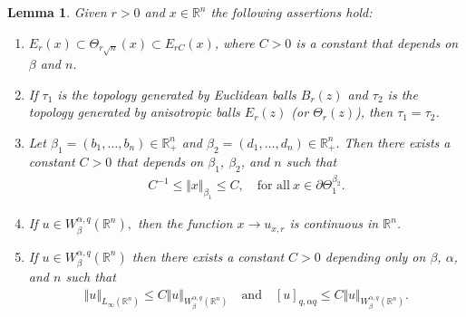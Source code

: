 \documentclass[10pt, leqno]{article}
\newtheorem{lemma}[theorem]{Lemma}
\theoremstyle{definition}
\theoremstyle{remark}
\numberwithin{equation}{section}
\begin{document}
\begin{lemma}
\label{elemntary results}
Given $r > 0$ and $x \in \mathbb{R}^{n}$ the following assertions hold:
\begin{enumerate}
\item $E^{}_{r}(x) \subset \Theta_{r\sqrt{n}}(x) \subset E_{rC}(x)$, where $C>0$ is a constant that depends on $\beta$ and $n$.
\item If $\tau_{1}$ is the topology generated by Euclidean balls $B_{r}(z)$ and $\tau_{2}$ is the topology generated by anisotropic balls $E_{r}(z)$ (or $\Theta_{r}(z)$), then $\tau_{1} = \tau_{2}$.
\item Let $\beta_{1} = (b_{1}, \dots, b_{n})\in \mathbb{R}_{+}^{n}$ and $\beta_{2} = (d_{1}, \dots, d_{n}) \in \mathbb{R}_{+}^{n}$. Then there exists a constant $C>0$ that depends on $\beta_{1}$, $\beta_{2}$, and $n$ such that
\begin{eqnarray}
\label{equivalence between norms on anisotropic sphere 1}
C^{-1} \leq \Vert x \Vert^{}_{\beta_{1}} \leq C, \quad \text{for all} \ x \in \partial \Theta^{\beta_{2}}_{1}.
\end{eqnarray}
\item If $u \in W_{\beta}^{\alpha, q}(\mathbb{R}^{n}),$ then the function $x \rightarrow u_{x, r}$ is continuous in $\mathbb{R}^{n}$.
\item If $u \in W_{\beta}^{\alpha, q}(\mathbb{R}^{n})$ then there exists a constant $C>0$ depending only on $\beta$, $\alpha$, and $n$ such that
\begin{eqnarray}
\Vert u \Vert_{L_{\infty}(\mathbb{R}^{n})} \leq C\Vert u \Vert_{W_{\beta}^{\alpha, q}(\mathbb{R}^{n})} \quad \text{and} \quad \left[ u \right]_{q, \alpha q} \leq C\Vert u \Vert_{W_{\beta}^{\alpha, q}(\mathbb{R}^{n})}.
\end{eqnarray}
\end{enumerate}
\end{lemma}
\end{document}
